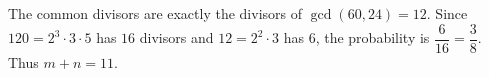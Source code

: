 The common divisors are exactly the divisors of $\gcd(60,24)=12$. Since $120=2^3\cdot3\cdot5$ has $16$ divisors and $12=2^2\cdot3$ has $6$, the probability is $\dfrac{6}{16}=\dfrac{3}{8}$. Thus $\boxed{m+n=11}$.
